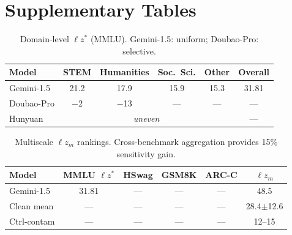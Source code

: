 \documentclass[11pt,a4paper]{article}
\begin{document}
\appendix
\section{Supplementary Tables}

\begin{table}[h]
\centering
\small
\begin{tabular}{lccccc}
\toprule
Model & STEM & Humanities & Soc.\ Sci. & Other & Overall \\
\midrule
Gemini-1.5 & 21.2 & 17.9 & 15.9 & 15.3 & 31.81 \\
Doubao-Pro & $-$2 & $-$13 & --- & --- & --- \\
Hunyuan & \multicolumn{4}{c}{\textit{uneven}} & --- \\
\bottomrule
\end{tabular}
\caption{Domain-level $\ell z^*$ (MMLU). Gemini-1.5: uniform; Doubao-Pro: selective.}
\label{tab:domain_lz}
\end{table}

\begin{table}[h]
\centering
\small
\begin{tabular}{lccccc}
\toprule
Model & MMLU $\ell z^*$ & HSwag & GSM8K & ARC-C & $\ell z_m$ \\
\midrule
Gemini-1.5 & 31.81 & --- & --- & --- & 48.5 \\
Clean mean & --- & --- & --- & --- & 28.4$\pm$12.6 \\
Ctrl-contam & --- & --- & --- & --- & 12--15 \\
\bottomrule
\end{tabular}
\caption{Multiscale $\ell z_m$ rankings. Cross-benchmark aggregation provides 15\% sensitivity gain.}
\label{tab:lzm}
\end{table}
\end{document}

